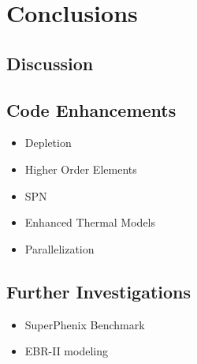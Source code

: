 \chapter{Conclusions}
\label{ch:conclusions}

\section{Discussion}

\section{Code Enhancements}
  \begin{itemize}
    \item Depletion
    \item Higher Order Elements
    \item SPN
    \item Enhanced Thermal Models
    \item Parallelization
  \end{itemize}

\section{Further Investigations}
  \begin{itemize}
    \item SuperPhenix Benchmark
    \item EBR-II modeling
  \end{itemize}
